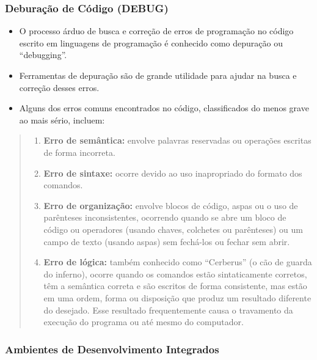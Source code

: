 \documentclass[12pt,a4paper]{article}
\providecommand{\tightlist}{%
      \setlength{\itemsep}{0pt}\setlength{\parskip}{0pt}}
\begin{document}
    \hypertarget{deburauxe7uxe3o-de-cuxf3digo-debug}{%
\subsubsection{Deburação de Código
(DEBUG)}\label{deburauxe7uxe3o-de-cuxf3digo-debug}}

    \begin{itemize}
\item
  O processo árduo de busca e correção de erros de programação no código
  escrito em linguagens de programação é conhecido como depuração ou
  ``debugging''.
\item
  Ferramentas de depuração são de grande utilidade para ajudar na busca
  e correção desses erros.
\item
  Alguns dos erros comuns encontrados no código, classificados do menos
  grave ao mais sério, incluem:
\end{itemize}

    \begin{quote}
\begin{enumerate}
\def\labelenumi{\arabic{enumi}.}
\tightlist
\item
  \textbf{Erro de semântica:} envolve palavras reservadas ou operações
  escritas de forma incorreta.
\item
  \textbf{Erro de sintaxe:} ocorre devido ao uso inapropriado do formato
  dos comandos.
\item
  \textbf{Erro de organização:} envolve blocos de código, aspas ou o uso
  de parênteses inconsistentes, ocorrendo quando se abre um bloco de
  código ou operadores (usando chaves, colchetes ou parênteses) ou um
  campo de texto (usando aspas) sem fechá-los ou fechar sem abrir.
\item
  \textbf{Erro de lógica:} também conhecido como ``Cerberus'' (o cão de
  guarda do inferno), ocorre quando os comandos estão sintaticamente
  corretos, têm a semântica correta e são escritos de forma consistente,
  mas estão em uma ordem, forma ou disposição que produz um resultado
  diferente do desejado. Esse resultado frequentemente causa o
  travamento da execução do programa ou até mesmo do computador.
\end{enumerate}
\end{quote}

    \hypertarget{ambientes-de-desenvolvimento-integrados}{%
\subsubsection{Ambientes de Desenvolvimento
Integrados}\label{ambientes-de-desenvolvimento-integrados}}
\end{document}
